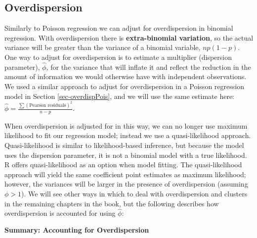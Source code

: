 \documentclass[
]{krantz}
\begin{document}
\hypertarget{sec-logOverdispersion}{%
\subsection{Overdispersion}\label{sec-logOverdispersion}}

Similarly to Poisson regression we can adjust for overdispersion in binomial regression. With overdispersion there is \textbf{extra-binomial variation}, so the actual variance will be greater than the variance of a binomial variable, \(np(1-p)\). One way to adjust for overdispersion is to estimate a multiplier (dispersion parameter), \(\hat{\phi}\), for the variance that will inflate it and reflect the reduction in the amount of information we would otherwise have with independent observations. We used a similar approach to adjust for overdispersion in a Poisson regression model in Section \ref{sec-overdispPois}, and we will use the same estimate here: \(\hat\phi=\frac{\sum(\textrm{Pearson residuals})^2}{n-p}\).

When overdispersion is adjusted for in this way, we can no longer use maximum likelihood to fit our regression model; instead we use a quasi-likelihood approach. Quasi-likelihood is similar to likelihood-based inference, but because the model uses the dispersion parameter, it is not a binomial model with a true likelihood. R offers quasi-likelihood as an option when model fitting. The quasi-likelihood approach will yield the same coefficient point estimates as maximum likelihood; however, the variances will be larger in the presence of overdispersion (assuming \(\phi>1\)). We will see other ways in which to deal with overdispersion and clusters in the remaining chapters in the book, but the following describes how overdispersion is accounted for using \(\hat{\phi}\):

\textbf{Summary: Accounting for Overdispersion}
\end{document}
